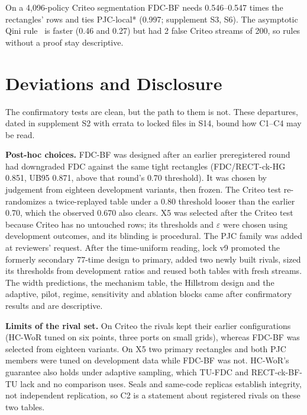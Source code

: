 \documentclass[sigconf,anonymous,review]{acmart}
\newcommand{\eps}{\varepsilon}
\begin{document}
On a 4,096-policy Criteo segmentation FDC-BF needs 0.546--0.547 times the rectangles' rows and ties PJC-local* (0.997; supplement S3, S6). The asymptotic Qini rule~\citep{sverdrup2023qini} is faster (0.46 and 0.27) but had 2 false Criteo streams of 200, so rules without a proof stay descriptive.

\section{Deviations and Disclosure}\label{sec:deviations}

The confirmatory tests are clean, but the path to them is not. These departures, dated in supplement S2 with errata to locked files in S14, bound how C1--C4 may be read.

\textbf{Post-hoc choices.} FDC-BF was designed after an earlier preregistered round had downgraded FDC against the same tight rectangles (FDC/RECT-ck-HG 0.851, UB95 0.871, above that round's 0.70 threshold). It was chosen by judgement from eighteen development variants, then frozen. The Criteo test re-randomizes a twice-replayed table under a 0.80 threshold looser than the earlier 0.70, which the observed 0.670 also clears. X5 was selected after the Criteo test because Criteo has no untouched rows; its thresholds and $\eps$ were chosen using development outcomes, and its blinding is procedural. The PJC family was added at reviewers' request. After the time-uniform reading, lock v9 promoted the formerly secondary 77-time design to primary, added two newly built rivals, sized its thresholds from development ratios and reused both tables with fresh streams. The width predictions, the mechanism table, the Hillstrom design and the adaptive, pilot, regime, sensitivity and ablation blocks came after confirmatory results and are descriptive.

\textbf{Limits of the rival set.} On Criteo the rivals kept their earlier configurations (HC-WoR tuned on six points, three ports on small grids), whereas FDC-BF was selected from eighteen variants. On X5 two primary rectangles and both PJC members were tuned on development data while FDC-BF was not. HC-WoR's guarantee also holds under adaptive sampling, which TU-FDC and RECT-ck-BF-TU lack and no comparison uses. Seals and same-code replicas establish integrity, not independent replication, so C2 is a statement about registered rivals on these two tables.

\end{document}
